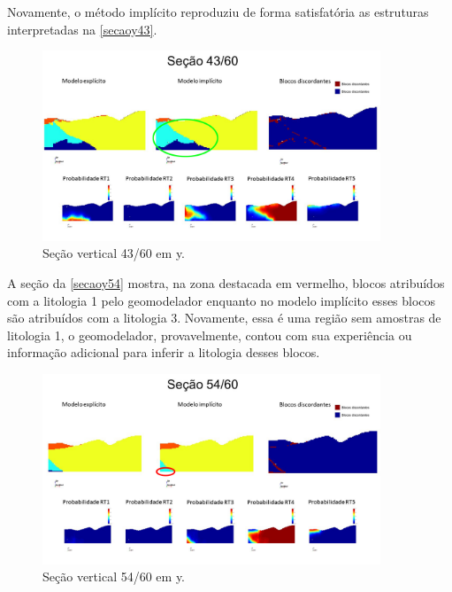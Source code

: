 Novamente, o método implícito reproduziu de forma satisfatória as estruturas interpretadas na \autoref{secaoy43}. 

\begin{figure}[H]
	\caption{\label{secaoy43}Seção vertical 43/60 em y.}
	\begin{center}
		\includegraphics[width=0.9\textwidth]{estudo_de_caso/secaoy43}
	\end{center}
\end{figure}

A seção da \autoref{secaoy54} mostra, na zona destacada em vermelho, blocos atribuídos com a litologia 1 pelo geomodelador enquanto no modelo implícito esses blocos são atribuídos com a litologia 3. Novamente, essa é uma região sem amostras de litologia 1, o geomodelador, provavelmente, contou com sua experiência ou informação adicional para inferir a litologia desses blocos.

\begin{figure}[H]
	\caption{\label{secaoy54}Seção vertical 54/60 em y.}
	\begin{center}
		\includegraphics[width=0.9\textwidth]{estudo_de_caso/secaoy54}
	\end{center}
\end{figure}

